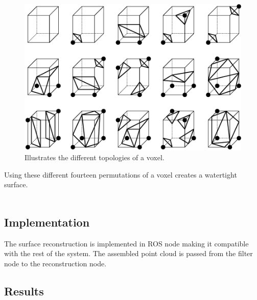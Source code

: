\begin{figure}[htb]
	\begin{center}
		\includegraphics[scale=0.7,trim=0 0 0 0]{graphics/07_modelling/marchingcubes.png}%
		\caption{Illustrates the different topologies of a voxel.}
		\label{fig:mc}
	\end{center}
\end{figure}

\noindent Using these different fourteen permutations of a voxel creates a watertight surface. \\
\\

\subsection{Implementation}
The surface reconstruction is implemented in ROS node making it compatible with the rest of the system. The assembled point cloud is passed from the filter node to the reconstruction node.


\subsection{Results}
